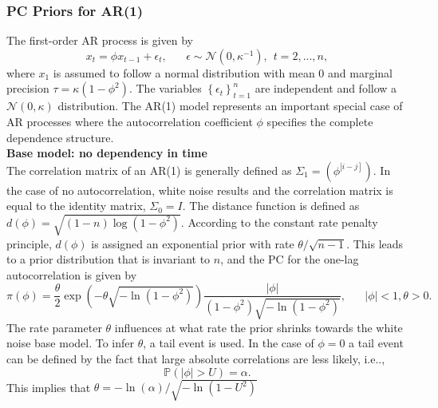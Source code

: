 \documentclass[12pt]{book}
\begin{document}
\subsubsection{PC Priors for AR(1)}
The first-order AR process is given by
\begin{equation}
    x_t=\phi x_{t-1}+\epsilon_t, \hspace{20pt}\epsilon\sim\mathcal{N}\left(0, \kappa^{-1}\right), \hspace{5pt} t=2,...,n,
\end{equation}
where $x_1$ is assumed to follow a normal distribution with mean $0$ and marginal precision $\tau=\kappa\left(1-\phi^2\right)$. The variables $\left\lbrace\epsilon_t\right\rbrace_{t=1}^n$ are independent and follow a $\mathcal{N}\left(0, \kappa\right)$ distribution. The AR(1) model represents an important special case of AR processes where the autocorrelation coefficient $\phi$ specifies the complete dependence structure.\vspace{6pt}\\
\textbf{Base model: no dependency in time} \vspace{6pt}\\
The correlation matrix of an AR(1) is generally defined as $\Sigma_1=\left(\phi^{\left|i-j\right]}\right)$. In the case of no autocorrelation, white noise results and the correlation matrix is equal to the identity matrix, $\Sigma_0=I$. The distance function is defined as $d\left(\phi\right)=\sqrt{\left(1-n\right)\log\left(1-\phi^2\right)}$. According to the constant rate penalty principle, $d\left(\phi\right)$ is assigned an exponential prior with rate $\theta/\sqrt{n-1}$. This leads to a prior distribution that is invariant to $n$, and the PC for the one-lag autocorrelation is given by
\begin{equation}
    \pi\left(\phi\right)=\frac{\theta}{2}\exp\left(-\theta\sqrt{-\ln\left(1-\phi^2\right)}\right)\frac{|\phi|}{\left(1-\phi^2\right)\sqrt{-\ln\left(1-\phi^2\right)}}, \hspace{20pt} |\phi|<1,\theta>0.
\end{equation}
The rate parameter $\theta$ influences at what rate the prior shrinks towards the white noise base model. To infer $\theta$, a tail event is used. In the case of $\phi = 0$ a tail event can be defined by the fact that large absolute correlations are less likely, i.e..,
\begin{equation*}
    \mathbb{P}\left(|\phi|>U\right) = \alpha.
\end{equation*}
This implies that $\theta=-\ln\left(\alpha\right)/\sqrt{-\ln\left(1-U^2\right)}$\vspace{6pt}\\
\end{document}
